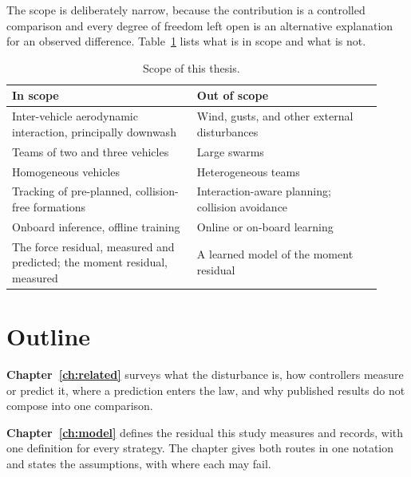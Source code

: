 The scope is deliberately narrow, because the contribution is a controlled comparison and every
degree of freedom left open is an alternative explanation for an observed difference.
Table~\ref{tab:intro-scope} lists what is in scope and what is not.

\begin{table}[h]
  \centering
  \caption{Scope of this thesis.}
  \label{tab:intro-scope}
  \small
  \begin{tabular}{@{}p{0.46\linewidth}p{0.46\linewidth}@{}}
    \toprule
    In scope & Out of scope \\
    \midrule
    Inter-vehicle aerodynamic interaction, principally downwash & Wind, gusts, and other external disturbances \\
    Teams of two and three vehicles & Large swarms \\
    Homogeneous vehicles & Heterogeneous teams \\
    Tracking of pre-planned, collision-free formations & Interaction-aware planning; collision avoidance \\
    Onboard inference, offline training & Online or on-board learning \\
    The force residual, measured and predicted; the moment residual, measured & A learned model of the moment residual \\
    \bottomrule
  \end{tabular}
\end{table}

\section{Outline}
\label{sec:intro-outline}

\textbf{Chapter~\ref{ch:related}} surveys what the disturbance is, how controllers measure or
predict it, where a prediction enters the law, and why published results do not compose into one
comparison.

\textbf{Chapter~\ref{ch:model}} defines the residual this study measures and records, with one
definition for every strategy. The
chapter gives both routes in one notation and states the assumptions, with where each may fail.

